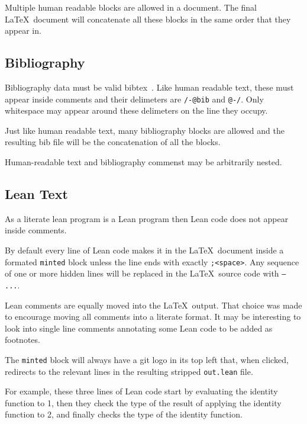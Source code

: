 Multiple human readable blocks are allowed in a document.
The final \LaTeX~document will concatenate all these blocks in the same order that they appear in.

\subsection{Bibliography}

Bibliography data must be valid bibtex~\cite{patashnik1984bibtex}.
Like human readable text, these must appear inside comments and their delimeters are \texttt{/-@bib} and \texttt{@-/}.
Only whitespace may appear around these delimeters on the line they occupy.


Just like human readable text, many bibliography blocks are allowed and the resulting bib file will be the concatenation of all the blocks.

Human-readable text and bibliography commenst may be arbitrarily nested.

\subsection{Lean Text}

As a literate lean program is a Lean program then Lean code does not appear inside comments.

By default every line of Lean code makes it in the \LaTeX~document inside a formated \texttt{minted} block unless the line ends with exactly \texttt{;<space>}.
Any sequence of one or more hidden lines will be replaced in the \LaTeX~source code with \texttt{-- ...}.

Lean comments are equally moved into the \LaTeX~output.
That choice was made to encourage moving all comments into a literate format.
It may be interesting to look into single line comments annotating some Lean code to be added as footnotes.

The \texttt{minted} block will always have a git logo in its top left that, when clicked, redirects to the relevant lines in the resulting stripped \texttt{out.lean} file.

For example, these three lines of Lean code start by evaluating the identity function to 1,
then they check the type of the result of applying the identity function to 2, and finally
checks the type of the identity function.

\noindent{}

